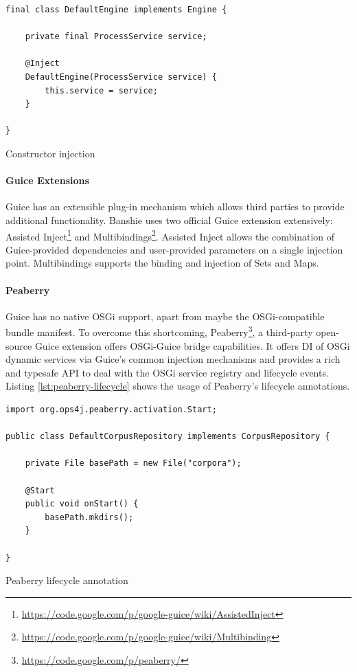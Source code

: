 \begin{listing}[H]
\begin{verbatim}
final class DefaultEngine implements Engine {

    private final ProcessService service;

    @Inject
    DefaultEngine(ProcessService service) {
        this.service = service;
    }

}
\end{verbatim}
\caption{Constructor injection}
\end{listing}

\paragraph{Guice Extensions}
Guice has an extensible plug-in mechanism which allows third parties to provide additional functionality. Banshie uses two official Guice extension extensively: Assisted Inject\footnote{\url{https://code.google.com/p/google-guice/wiki/AssistedInject}} and Multibindings\footnote{\url{https://code.google.com/p/google-guice/wiki/Multibinding}}. Assisted Inject allows the combination of Guice-provided dependencies and user-provided parameters on a single injection point. Multibindings supports the binding and injection of Sets and Maps.

\paragraph{Peaberry}
Guice has no native OSGi support, apart from maybe the OSGi-compatible bundle manifest. To overcome this shortcoming, Peaberry\footnote{\url{https://code.google.com/p/peaberry/}}, a third-party open-source Guice extension offers OSGi-Guice bridge capabilities. It offers \gls{DI} of OSGi dynamic services via Guice's common injection mechanisms and provides a rich and typesafe API to deal with the OSGi service registry and lifecycle events. Listing \ref{lst:peaberry-lifecycle} shows the usage of Peaberry's lifecycle annotations.

\begin{listing}[H]
\begin{verbatim}
import org.ops4j.peaberry.activation.Start;

public class DefaultCorpusRepository implements CorpusRepository {

    private File basePath = new File("corpora");

    @Start
    public void onStart() {
        basePath.mkdirs();
    }

}
\end{verbatim}
\caption{Peaberry lifecycle annotation}
\label{lst:peaberry-lifecycle}
\end{listing}

